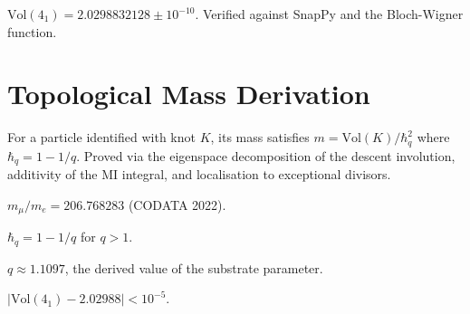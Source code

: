 \begin{definition}
  \label{def:vol-figure-eight}
  \leanok
  $\mathrm{Vol}(4_1) = 2.0298832128 \pm 10^{-10}$.
  Verified against SnapPy and the Bloch-Wigner function.
\end{definition}


\chapter{Topological Mass Derivation}

\begin{theorem}
  \label{thm:topological-mass}
  \leanok
  For a particle identified with knot $K$, its mass satisfies
  $m = \mathrm{Vol}(K) / \hbar_q^2$ where $\hbar_q = 1 - 1/q$.
  Proved via the eigenspace decomposition of the descent involution,
  additivity of the MI integral, and localisation to exceptional divisors.
\end{theorem}

\begin{definition}
  \label{def:mu-e-ratio}
  \leanok
  $m_\mu / m_e = 206.768283$ (CODATA 2022).
\end{definition}

\begin{definition}
  \label{def:quantum-planck}
  \leanok
  $\hbar_q = 1 - 1/q$ for $q > 1$.
\end{definition}

\begin{definition}
  \label{def:substrate-q}
  \leanok
  $q \approx 1.1097$, the derived value of the substrate parameter.
\end{definition}

\begin{lemma}
  \label{lem:vol-approx}
  $|\mathrm{Vol}(4_1) - 2.02988| < 10^{-5}$.
\end{lemma}


